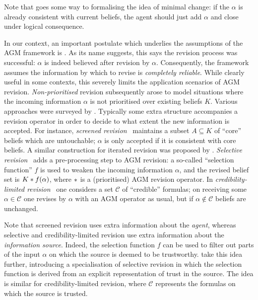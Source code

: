 {\begin{axiomlist}
\end{axiomlist}

Note that  goes some way to formalising the idea of minimal
change: if the $\alpha$ is already consistent with current beliefs, the agent
should just add $\alpha$ and close under logical consequence.

In our context, an important postulate which underlies the assumptions of the
AGM framework is . As its name suggests, this says the
revision process was successful: $\alpha$ is indeed believed after revision by
$\alpha$. Consequently, the framework assumes the information by which to
revise is \emph{completely reliable}. While clearly useful in some contexts,
this severely limits the application scenarios of AGM revision.
\emph{Non-prioritised} revision subsequently arose to model situations where
the incoming information $\alpha$ is not prioritised over existing beliefs $K$.
Various approaches were surveyed by \textcite{hansson1999survey}. Typically
some extra structure accompanies a revision operator in order to decide to what
extent the new information is accepted. For instance, \emph{screened
revision}~\cite{makinson1997screened} maintains a subset $A \subseteq K$ of
``core'' beliefs which are untouchable; $\alpha$ is only accepted if it is
consistent with core beliefs. A similar construction for iterated revision was
proposed by \textcite{booth2005}. \emph{Selective
revision}~\cite{ferme1999selective} adds a pre-processing step to AGM revision:
a so-called ``selection function'' $f$ is used to weaken the incoming
information $\alpha$, and the revised belief set is $K \ast f(\alpha)$,
where $\ast$ is a (prioritised) AGM revision operator. In
\emph{credibility-limited revision}~\cite{hansson_2001} one considers a set
$\mathcal{C}$ of ``credible'' formulas; on receiving some $\alpha \in
\mathcal{C}$ one revises by $\alpha$ with an AGM operator as usual, but if
$\alpha \notin \mathcal{C}$ beliefs are unchanged.

Note that screened revision uses extra information about the \emph{agent},
whereas selective and credibility-limited revision use extra information about
the \emph{information source}. Indeed, the selection function $f$ can be used
to filter out parts of the input $\alpha$ on which the source is deemed to be
trustworthy. \textcite{booth_trust_2018} take this idea further, introducing a
specialisation of selective revision in which the selection function is derived
from an explicit representation of trust in the source. The idea is similar for
credibility-limited revision, where $\mathcal{C}$ represents the formulas on
which the source is trusted.

}
